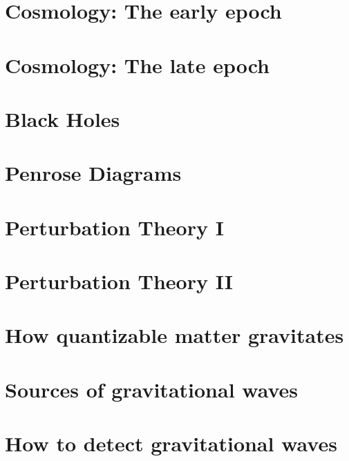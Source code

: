 \documentclass[
11pt, %
a4paper, %
oneside, %
headinclude,footinclude, %
]{scrartcl}
\begin{document}
\section{Cosmology: The early epoch  }

\section{Cosmology: The late epoch}

\section{Black Holes}

\section{Penrose Diagrams }

\section{ Perturbation Theory I }

\section{Perturbation Theory II }

\section{How quantizable matter gravitates}

\section{Sources of gravitational waves}

\section{ How to detect gravitational waves}




%


\end{document}
